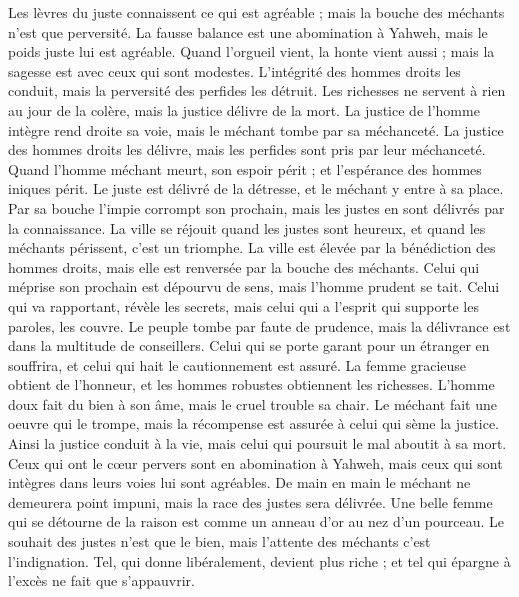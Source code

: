 \begin{multicols}{2}
Les lèvres du juste connaissent ce qui est agréable ; mais la bouche des méchants n'est que perversité.
\VerseOne{}La fausse balance est une abomination à Yahweh, mais le poids juste lui est agréable.
Quand l'orgueil vient, la honte vient aussi ; mais la sagesse est avec ceux qui sont modestes.
L'intégrité des hommes droits les conduit, mais la perversité des perfides les détruit.
Les richesses ne servent à rien au jour de la colère, mais la justice délivre de la mort.
La justice de l'homme intègre rend droite sa voie, mais le méchant tombe par sa méchanceté.
La justice des hommes droits les délivre, mais les perfides sont pris par leur méchanceté.
Quand l'homme méchant meurt, son espoir périt ; et l'espérance des hommes iniques périt.
Le juste est délivré de la détresse, et le méchant y entre à sa place.
Par sa bouche l'impie corrompt son prochain, mais les justes en sont délivrés par la connaissance.
La ville se réjouit quand les justes sont heureux, et quand les méchants périssent, c'est un triomphe.
La ville est élevée par la bénédiction des hommes droits, mais elle est renversée par la bouche des méchants.
Celui qui méprise son prochain est dépourvu de sens, mais l'homme prudent se tait.
Celui qui va rapportant, révèle les secrets, mais celui qui a l'esprit qui supporte les paroles, les couvre.
Le peuple tombe par faute de prudence, mais la délivrance est dans la multitude de conseillers.
Celui qui se porte garant pour un étranger en souffrira, et celui qui hait le cautionnement est assuré.
La femme gracieuse obtient de l'honneur, et les hommes robustes obtiennent les richesses.
L'homme doux fait du bien à son âme, mais le cruel trouble sa chair.
Le méchant fait une oeuvre qui le trompe, mais la récompense est assurée à celui qui sème la justice.
Ainsi la justice conduit à la vie, mais celui qui poursuit le mal aboutit à sa mort.
Ceux qui ont le cœur pervers sont en abomination à Yahweh, mais ceux qui sont intègres dans leurs voies lui sont agréables.
De main en main le méchant ne demeurera point impuni, mais la race des justes sera délivrée.
Une belle femme qui se détourne de la raison est comme un anneau d'or au nez d'un pourceau.
Le souhait des justes n'est que le bien, mais l'attente des méchants c'est l'indignation.
Tel, qui donne libéralement, devient plus riche ; et tel qui épargne à l'excès ne fait que s'appauvrir.

\end{multicols}
